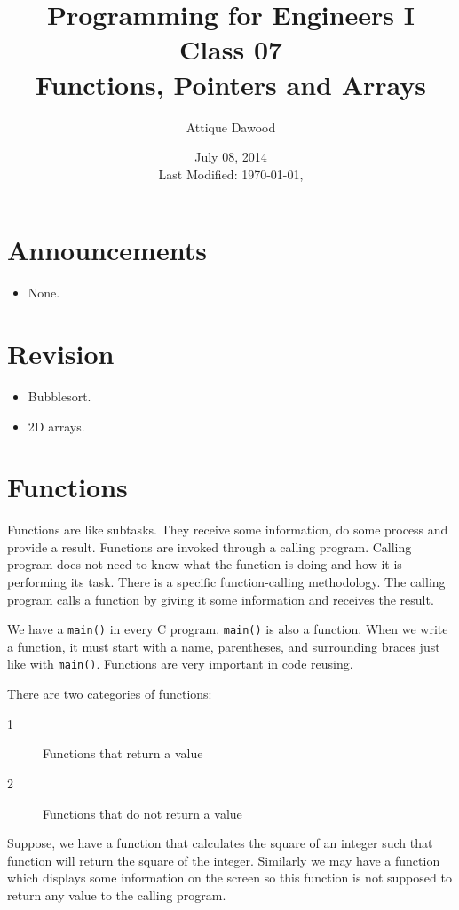 \documentclass[12pt,a4paper]{article}
\title{Programming for Engineers I\\Class 07\\Functions, Pointers and Arrays}
\author{Attique Dawood}
\date{July 08, 2014\\[0.2cm] Last Modified: \today, \currenttime}
\begin{document}
\maketitle
\section{Announcements}
\begin{itemize}
\item None.
\end{itemize}
\section{Revision}
\begin{itemize}
\item Bubblesort.
\item 2D arrays.
\end{itemize}
\section{Functions}
Functions are like subtasks. They receive some information, do some process and provide a result. Functions are invoked through a calling program. Calling program does not need to know what the function is doing and how it is performing its task. There is a specific function-calling methodology. The calling program calls a function by giving it some information and receives the result.

We have a \verb|main()| in every C program. \verb|main()| is also a function. When we write a function, it must start with a name, parentheses, and surrounding braces just like with \verb|main()|. Functions are very important in code reusing.

There are two categories of functions:

\begin{description}
\item [1]Functions that return a value
\item [2]Functions that do not return a value
\end{description}

Suppose, we have a function that calculates the square of an integer such that function will return the square of the integer. Similarly we may have a function which displays some information on the screen so this function is not supposed to return any value to the calling program.
\end{document}
